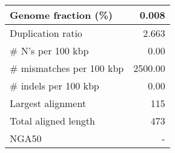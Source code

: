 \documentclass[12pt,a4paper]{article}
\begin{document}
\begin{table}[ht]
\begin{center}
\begin{tabular}{|l*{1}{|r}|}
Genome fraction (\%) & 0.008 \\ \hline
Duplication ratio & 2.663 \\ \hline
\# N's per 100 kbp & 0.00 \\ \hline
\# mismatches per 100 kbp & 2500.00 \\ \hline
\# indels per 100 kbp & 0.00 \\ \hline
Largest alignment & 115 \\ \hline
Total aligned length & 473 \\ \hline
NGA50 & - \\ \hline
\end{tabular}
\end{center}
\end{table}
\end{document}
